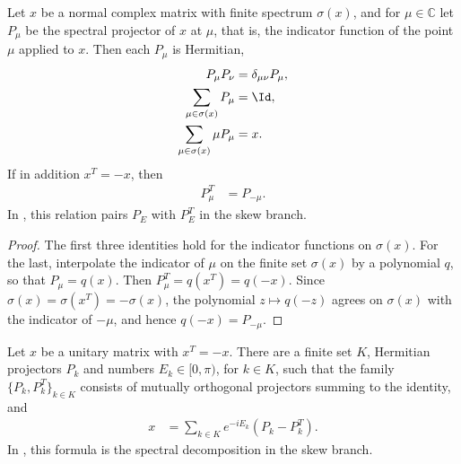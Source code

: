 \begin{lemma}
    \label{lem:mpu_transpose_spectral_projector}
    \leanok
    Let $x$ be a normal complex matrix with finite spectrum $\sigma(x)$, and for
    $\mu\in\mathbb C$ let $P_\mu$ be the spectral projector of $x$ at $\mu$,
    that is, the indicator function of the point $\mu$ applied to $x$. Then
    each $P_\mu$ is Hermitian,
    \begin{align}
        P_\mu P_\nu                     & =\delta_{\mu\nu}P_\mu, \\
        \sum_{\mu\in\sigma(x)}P_\mu     & =\Id,                  \\
        \sum_{\mu\in\sigma(x)}\mu P_\mu & =x.
    \end{align}
    If in addition $x^T=-x$, then
    \begin{align}
        P_\mu^T & =P_{-\mu}.
    \end{align}
    In \cite[Lemma~\texttt{lemma:conjclass-normalform-continuous}]{Cirac2017MPU}, this relation pairs $P_E$ with $P_E^T$ in the skew
    branch.
\end{lemma}

\begin{proof}\leanok
    The first three identities hold for the indicator functions on
    $\sigma(x)$. For the last, interpolate the indicator of $\mu$ on the
    finite set $\sigma(x)$ by a polynomial $q$, so that $P_\mu=q(x)$. Then
    $P_\mu^T=q(x^T)=q(-x)$. Since $\sigma(x)=\sigma(x^T)=-\sigma(x)$, the
    polynomial $z\mapsto q(-z)$ agrees on $\sigma(x)$ with the indicator of
    $-\mu$, and hence $q(-x)=P_{-\mu}$.
\end{proof}

\begin{lemma}
    \label{lem:mpu_skew_unitary_paired_spectral_data}
    \leanok
    Let $x$ be a unitary matrix with $x^T=-x$. There are a finite set $K$,
    Hermitian projectors $P_k$ and numbers $E_k\in[0,\pi)$, for $k\in K$,
    such that the family $\{P_k,P_k^T\}_{k\in K}$ consists of mutually
    orthogonal projectors summing to the identity, and
    \begin{align}
        x & = \sum_{k\in K} e^{-iE_k}(P_k-P_k^T).
    \end{align}
    In \cite[Lemma~\texttt{lemma:conjclass-normalform-continuous}]{Cirac2017MPU}, this formula is the spectral decomposition in the skew
    branch.
\end{lemma}

